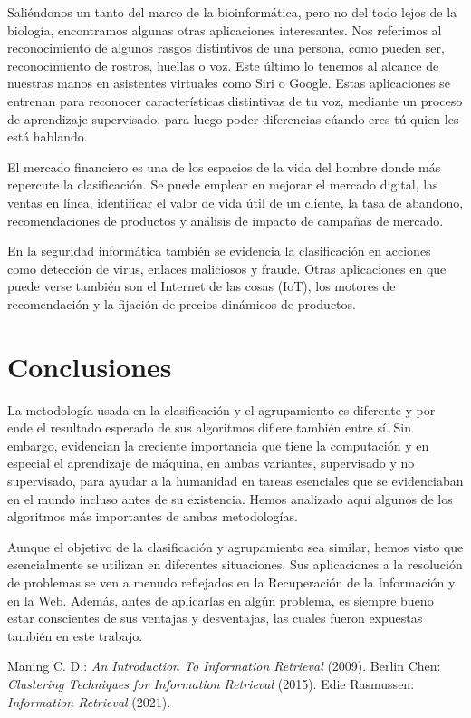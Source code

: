 \documentclass{llncs}
\begin{document}
Sali\'endonos un tanto del marco de la bioinform\'atica, pero no del todo lejos de la biolog\'ia, encontramos algunas otras aplicaciones interesantes. Nos referimos al reconocimiento de algunos rasgos distintivos de una persona, como pueden ser, reconocimiento de rostros, huellas o voz. Este \'ultimo lo tenemos al alcance de nuestras manos en asistentes virtuales como Siri o  Google. Estas aplicaciones se entrenan para reconocer caracter\'isticas distintivas de tu voz, mediante un proceso de aprendizaje supervisado, para luego poder diferencias c\'uando eres t\'u quien les est\'a hablando.

El mercado financiero es una de los espacios de la vida del hombre donde m\'as repercute la clasificaci\'on. Se puede emplear en mejorar el mercado digital, las ventas en l\'inea, identificar el valor de vida \'util de un cliente, la tasa de abandono, recomendaciones de productos y an\'alisis de impacto de campa\~nas de mercado.

En la seguridad inform\'atica tambi\'en se evidencia la clasificaci\'on en acciones como detecci\'on de virus, enlaces maliciosos y fraude. Otras aplicaciones en que puede verse tambi\'en son el Internet de las cosas (IoT), los motores de recomendaci\'on y la fijaci\'on de precios din\'amicos de productos.

\section{Conclusiones}

	La metodolog\'ia usada en la clasificaci\'on y el agrupamiento es diferente y por ende el resultado esperado de sus algoritmos difiere tambi\'en entre s\'i. Sin embargo, evidencian la creciente importancia que tiene la computaci\'on y en especial el aprendizaje de m\'aquina, en ambas variantes, supervisado y no supervisado, para ayudar a la humanidad en tareas esenciales que se evidenciaban en el mundo incluso antes de su existencia. Hemos analizado aqu\'i algunos de los algoritmos m\'as importantes de ambas metodolog\'ias. 
	
	Aunque el objetivo de la clasificaci\'on y agrupamiento sea similar, hemos visto que esencialmente se utilizan en diferentes situaciones.  Sus aplicaciones a la resoluci\'on de problemas se ven a menudo reflejados en la Recuperaci\'on de la Informaci\'on y en la Web. Adem\'as, antes de aplicarlas en alg\'un problema, es siempre bueno estar conscientes de sus ventajas y desventajas, las cuales fueron expuestas tambi\'en en este trabajo.

\begin{thebibliography}{20}
	 Maning C. D.: \emph{An Introduction To Information Retrieval} (2009).
	 Berlin Chen: \emph{Clustering Techniques for
		Information Retrieval} (2015).
	 Edie Rasmussen: \emph{Information Retrieval} (2021).
\end{thebibliography}
\end{document}
